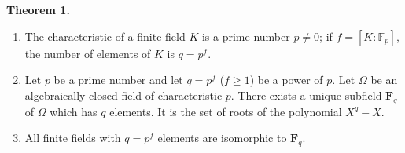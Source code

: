 \textbf{Theorem 1.}~
\begin{enumerate}
\item[(i)] The characteristic of a finite field $K$ is a prime number $p \neq 0$; if $f = [K:\mathbb{F}_p]$, the number of elements of $K$ is $q = p^f$.
\item[(ii)] Let $p$ be a prime number and let $q = p^f$ ($f \geq 1$) be a power of $p$. Let $\Omega$ be an algebraically closed field of characteristic $p$. There exists a unique subfield $\mathbf{F}_q$ of $\Omega$ which has $q$ elements. It is the set of roots of the polynomial $X^q - X$.
\item[(iii)] All finite fields with $q = p^f$ elements are isomorphic to $\mathbf{F}_q$.
\end{enumerate}
